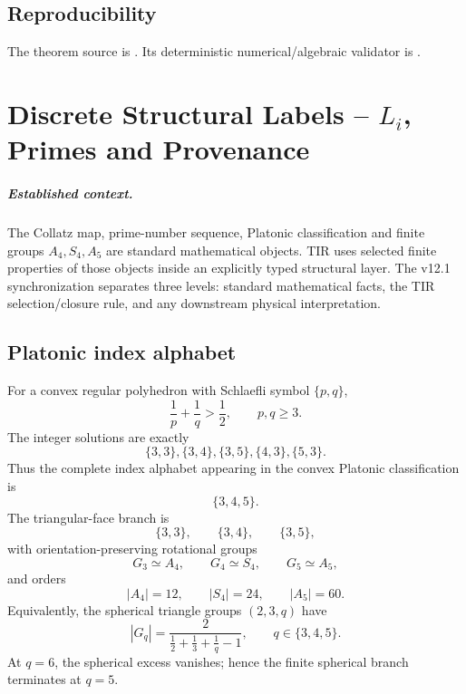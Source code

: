 \section{Reproducibility}
The theorem source is
.
Its deterministic numerical/algebraic validator is
.

\clearpage

\chapter[Discrete Structural Labels]{Discrete Structural Labels -- $L_i$, Primes and Provenance}
\label{ch:v12_discrete_labels}

\paragraph{Established context.}
The Collatz map, prime-number sequence, Platonic classification and finite groups
\(A_4,S_4,A_5\) are standard mathematical objects.  TIR uses selected finite
properties of those objects inside an explicitly typed structural layer.  The
v12.1 synchronization separates three levels: standard mathematical facts, the
TIR selection/closure rule, and any downstream physical interpretation.

\section{Platonic index alphabet}

For a convex regular polyhedron with Schlaefli symbol \(\{p,q\}\),
\[
\frac1p+\frac1q>\frac12,
\qquad p,q\ge3.
\]
The integer solutions are exactly
\[
\boxed{
\{3,3\},\{3,4\},\{3,5\},\{4,3\},\{5,3\}.
}
\]
Thus the complete index alphabet appearing in the convex Platonic
classification is
\[
\boxed{\{3,4,5\}}.
\]
The triangular-face branch is
\[
\{3,3\},\qquad\{3,4\},\qquad\{3,5\},
\]
with orientation-preserving rotational groups
\[
G_3\simeq A_4,
\qquad
G_4\simeq S_4,
\qquad
G_5\simeq A_5,
\]
and orders
\[
|A_4|=12,
\qquad |S_4|=24,
\qquad |A_5|=60.
\]
Equivalently, the spherical triangle groups \((2,3,q)\) have
\[
|G_q|
=\frac{2}{\frac12+\frac13+\frac1q-1},
\qquad q\in\{3,4,5\}.
\]
At \(q=6\), the spherical excess vanishes; hence the finite spherical branch
terminates at \(q=5\).

